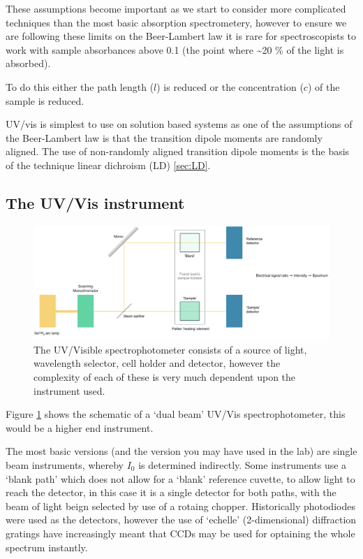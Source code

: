 \documentclass[
]{book}
\begin{document}
These assumptions become important as we start to consider more complicated techniques than the most basic absorption spectrometery, however to ensure we are following these limits on the Beer-Lambert law it is rare for spectroscopists to work with sample absorbances above 0.1 (the point where \textasciitilde20 \% of the light is absorbed).

To do this either the path length (\(l\)) is reduced or the concentration (\(c\)) of the sample is reduced.

UV/vis is simplest to use on solution based systems as one of the assumptions of the Beer-Lambert law is that the transition dipole moments are randomly aligned. The use of non-randomly aligned transition dipole moments is the basis of the technique linear dichroism (LD) \ref{sec:LD}.

\hypertarget{sec:UVinstrument}{%
\subsection{The UV/Vis instrument}\label{sec:UVinstrument}}

\begin{figure}

{\centering \includegraphics[width=1\linewidth]{images/UVvis} 

}

\caption{The UV/Visible spectrophotometer consists of a source of light, wavelength selector, cell holder and detector, however the complexity of each of these is very much dependent upon the instrument used.}\label{fig:UV}
\end{figure}

Figure \ref{fig:UV} shows the schematic of a `dual beam' UV/Vis spectrophotometer, this would be a higher end instrument.

The most basic versions (and the version you may have used in the lab) are single beam instruments, whereby \(I_0\) is determined indirectly. Some instruments use a `blank path' which does not allow for a `blank' reference cuvette, to allow light to reach the detector, in this case it is a single detector for both paths, with the beam of light beign selected by use of a rotaing chopper. Historically photodiodes were used as the detectors, however the use of `echelle' (2-dimensional) diffraction gratings have increasingly meant that CCDs may be used for optaining the whole spectrum instantly.
\end{document}
